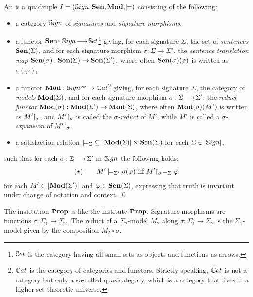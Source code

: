 \documentclass[10pt,%
\ifpretendfinal
final%
\else
draft%
\fi,
]{scrreprt}
\begin{document}
\begin{definition}\label{def:inst} An
 \cite{Institutions} is a quadruple $I=(\mathbb{S}ign,\mathbf {Sen},\mathbf{Mod},{\models})$
consisting of the following:
%
\begin{itemize}
\item a category $\mathbb{S}ign$ of \emph{signatures} and \emph{signature morphisms},
\item a functor $\mathbf {Sen}\colon\mathbb{S}ign\!\longrightarrow\!\mathbb{S}et$\footnote{$\mathbb{S}et$ is the
category having all small \textsc{}sets as objects and functions as
arrows.}  giving, for each signature $\Sigma$, the set of
\emph{sentences} $\mathbf {Sen}(\Sigma)$, and for each signature morphism
$\sigma:{\Sigma}\to{\Sigma'}$, the \emph{sentence translation map}
$\mathbf {Sen}(\sigma):{\mathbf {Sen}(\Sigma)}\to{\mathbf {Sen}(\Sigma')}$, where often
$\mathbf {Sen}(\sigma)(\varphi)$ is written as $\sigma(\varphi)$, \item a
functor $\mathbf{Mod}:{\mathbb{S}ign^{op}}\to{\mathbb{C}at}$\footnote {$\mathbb{C}at$ is the category
of categories and functors. Strictly speaking, $\mathbb{C}at$ is not a
category but only a so-called quasicategory, which is a category that
lives in a higher set-theoretic universe.} giving, for each signature
$\Sigma$, the category of \emph{models} $\mathbf{Mod}(\Sigma)$, and for each
signature morphism $\sigma\colon\Sigma\!\longrightarrow\!\Sigma'$, the \emph{reduct
functor\/} $\mathbf{Mod}(\sigma):{\mathbf{Mod}(\Sigma')}\to {\mathbf{Mod}(\Sigma)}$, where
often $\mathbf{Mod}(\sigma)(M')$ is written as $M'\hspace{-.3em}\upharpoonright_{\sigma}$, and
$M'\hspace{-.3em}\upharpoonright_{\sigma}$ is called the \emph{$\sigma$-reduct} of $M'$,
while $M'$ is called a \emph{$\sigma$-expansion} of
$M'\hspace{-.3em}\upharpoonright_{\sigma}$,
\item a satisfaction relation
${\models_{\Sigma}}\subseteq|{\mathbf{Mod}(\Sigma)|\times\mathbf {Sen}(\Sigma)}$ for
each $\Sigma\in |\mathbb{S}ign|$,
\end{itemize}
%
such that for each $\sigma\colon\Sigma\!\longrightarrow\!\Sigma'$ in $\mathbb{S}ign$ the following  holds:
$$
(\star) \qquad M'\models_{\Sigma'}\sigma(\varphi) \mbox{ iff }
M'\hspace{-.3em}\upharpoonright_{\sigma} \models_{\Sigma} \varphi
$$
for each $M'\in |\mathbf{Mod}(\Sigma')|$ and $\varphi\in \mathbf {Sen}(\Sigma)$,
expressing that truth is invariant under change of notation and
context.  \qed
\end{definition}

\begin{definition}\label{Prop}
The institution $\mathbf{Prop}$ is like the institute $\mathbf{Prop}$. Signature morphisms are functions
$\sigma:{\Sigma_1}\to{\Sigma_2}$. The reduct of a $\Sigma_2$-model $M_2$ along 
$\sigma:{\Sigma_1}\to{\Sigma_2}$ is the $\Sigma_1$-model given by the composition $M_2\circ\sigma$. 
\end{definition}
\end{document}
